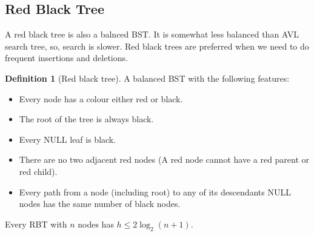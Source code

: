 \documentclass[10pt, a4paper]{extarticle}
\theoremstyle{definition}
\newtheorem{defn}{Definition}
\begin{document}
	\subsection{Red Black Tree}
	A red black tree is also a balnced BST. It is somewhat less balanced than AVL search tree, so, search is slower. Red black trees are preferred when we need to do frequent insertions and deletions.
	\begin{defn}[Red black tree]
		A balanced BST with the following features:
		\begin{itemize}
			\item Every node has a colour either red or black.
			\item The root of the tree is always black.
			\item Every NULL leaf is black.
			\item There are no two adjacent red nodes (A red node cannot have a red parent or red child).
			\item Every path from a node (including root) to any of its descendants NULL nodes has the same number of black nodes.
		\end{itemize}
		Every RBT with $n$ nodes has $h\leq 2\log_2(n+1)$.
	\end{defn}
\end{document}
